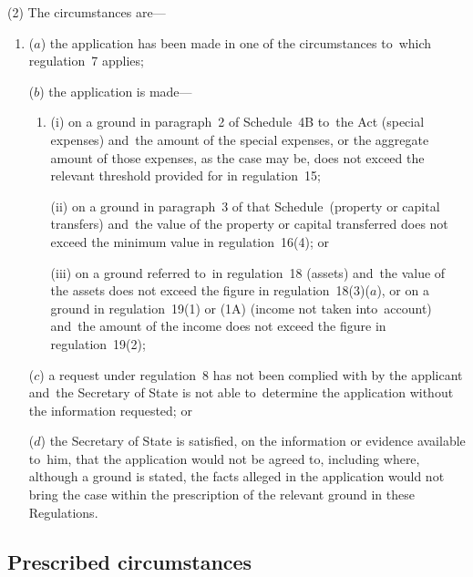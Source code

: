 \documentclass[12pt,a4paper]{article}
\begin{document}
(2) The circumstances are—
\begin{enumerate}\item[]
($a$) the application has been made in one of the circumstances to~which regulation~7 applies;

($b$) the application is made—
\begin{enumerate}\item[]
(i) on a ground in paragraph~2 of Schedule~4B to~the Act (special expenses) and~the amount of the special expenses, or the aggregate amount of those expenses, as the case may be, does not exceed the relevant threshold provided for in regulation~15;

(ii) on a ground in paragraph~3 of that Schedule~(property or capital transfers) and~the value of the property or capital transferred does not exceed the minimum value in regulation~16(4); or

(iii) on a ground referred to~in regulation~18 (assets) and~the value of the assets does not exceed the figure in regulation~18(3)($a$), or on a ground in regulation~19(1) 
or (1A)  %
(income not taken into~account) and~the amount of the income does not exceed the figure in regulation~19(2);
\end{enumerate}

($c$) a request under regulation~8 has not been complied with by the applicant and~the Secretary of State is not able to~determine the application without the information requested; or

($d$) the Secretary of State is satisfied, on the information or evidence available to~him, that the application would not be agreed to, including where, although a ground is stated, the facts alleged in the application would not bring the case within the prescription of the relevant ground in these Regulations.
\end{enumerate}


\subsection[7. Prescribed circumstances]{Prescribed circumstances}
\end{document}
